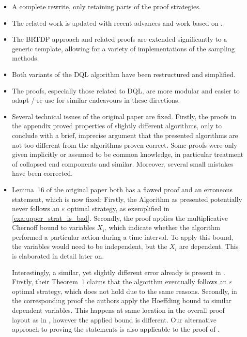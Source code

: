 \documentclass{theoretics}
\begin{document}
\begin{itemize}
	\item
	A complete rewrite, only retaining parts of the proof strategies.

	\item
	The related work is updated with recent advances and work based on \cite{DBLP:conf/atva/BrazdilCCFKKPU14}.

	\item
	The BRTDP approach and related proofs are extended significantly to a generic template, allowing for a variety of implementations of the sampling methods.

	\item
	Both variants of the DQL algorithm have been restructured and simplified.

	\item
	The proofs, especially those related to DQL, are more modular and easier to adapt / re-use for similar endeavours in these directions.

	\item
	Several technical issues of the original paper are fixed.
	Firstly, the proofs in the appendix proved properties of slightly different algorithms, only to conclude with a brief, imprecise argument that the presented algorithms are not too different from the algorithms proven correct.
	Some proofs were only given implicitly or assumed to be common knowledge, in particular treatment of collapsed end components and similar.
	Moreover, several small mistakes have been corrected.

	\item
	Lemma~16 of the original paper both has a flawed proof and an erroneous statement, which is now fixed:
	Firstly, the Algorithm as presented potentially never follows an $\varepsilon$ optimal strategy, as exemplified in \cref{exa:upper_strat_is_bad}.
	Secondly, the proof applies the multiplicative Chernoff bound to variables $X_i$, which indicate whether the algorithm performed a particular action during a time interval.
	To apply this bound, the variables would need to be independent, but the $X_i$ are dependent.
	This is elaborated in detail later on.

	Interestingly, a similar, yet slightly different error already is present in \cite{DBLP:conf/icml/StrehlLWLL06}.
	Firstly, their Theorem~1 claims that the algorithm eventually follows an $\varepsilon$ optimal strategy, which does not hold due to the same reasons.
	Secondly, in the corresponding proof the authors apply the Hoeffding bound to similar dependent variables.
	This happens at same location in the overall proof layout as in \cite{DBLP:conf/atva/BrazdilCCFKKPU14}, however the applied bound is different.
	Our alternative approach to proving the statements is also applicable to the proof of \cite{DBLP:conf/icml/StrehlLWLL06}.
\end{itemize}
\end{document}
